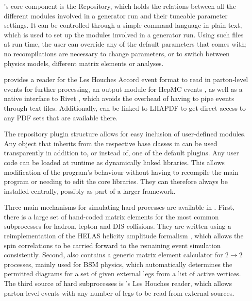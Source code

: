 \thepeg's core component is the Repository, which holds the relations
between all the different modules involved in a generator run and
their tuneable parameter settings. It can be controlled through a
simple command language in plain text, which is used to set up the
modules involved in a generator run.  Using such files at run time,
the user can override any of the default parameters that \Herwigpp
comes with; no recompilations are necessary to change parameters, or to
switch between physics models, different matrix elements or analyses.

\thepeg provides a reader for the Les Houches Accord event format
\cite{Alwall:2006yp} to read in parton-level events for further processing, an
output module for HepMC events \cite{Dobbs:2001ck}, as well as a native
interface to Rivet \cite{Buckley:2010ar}, which avoids the overhead of having
to pipe events through text files. Additionally, \thepeg can be linked
to LHAPDF \cite{Whalley:2005nh} to get direct access to any PDF sets that are
available there.

The repository plugin structure allows for easy inclusion of user-defined
modules. Any \cpp object that inherits from the respective base
classes in \thepeg can be used transparently in addition to, or instead
of, one of the default plugins. Any user code can be loaded at
runtime as dynamically linked libraries. This allows modification
of the program's behaviour without having to recompile the 
main program or needing to edit the core libraries.
They can therefore always be installed centrally, possibly as part of a larger framework.


\mcsubsection{\gensectionhard} 
Three main mechanisms for
simulating hard processes are available 
in \herwigpp. First, there is a large set of
hand-coded matrix elements for the most common subprocesses for hadron,
lepton and DIS collisions. They are written using a reimplementation
of the HELAS helicity amplitude formalism \cite{Murayama:1992gi}, which allows
the spin correlations to be carried forward to the remaining event
simulation consistently. Second, \Herwigpp also contains a generic
matrix element calculator for $2 \to 2$ processes, mainly used for BSM
physics, which automatically determines the permitted diagrams for a
set of given external legs from a list of active vertices. The third
source of hard subprocesses is \thepeg's Les Houches reader, which
allows parton-level events with any number of legs to be read from
external sources.


